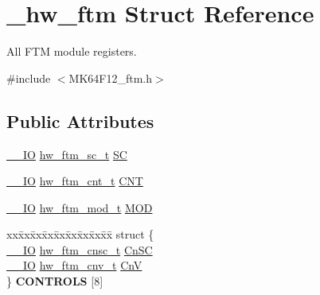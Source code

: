\hypertarget{struct__hw__ftm}{}\section{\+\_\+hw\+\_\+ftm Struct Reference}
\label{struct__hw__ftm}


All F\+TM module registers.  




{\ttfamily \#include $<$M\+K64\+F12\+\_\+ftm.\+h$>$}

\subsection*{Public Attributes}
\begin{DoxyCompactItemize}
\item 
\hyperlink{core__sc300_8h_aec43007d9998a0a0e01faede4133d6be}{\+\_\+\+\_\+\+IO} \hyperlink{union__hw__ftm__sc}{hw\+\_\+ftm\+\_\+sc\+\_\+t} \hyperlink{struct__hw__ftm_a7c673792073e9fee52359933a9a89143}{SC}
\item 
\hyperlink{core__sc300_8h_aec43007d9998a0a0e01faede4133d6be}{\+\_\+\+\_\+\+IO} \hyperlink{union__hw__ftm__cnt}{hw\+\_\+ftm\+\_\+cnt\+\_\+t} \hyperlink{struct__hw__ftm_a3869a58f40d4aece53973dab2e9932f7}{C\+NT}
\item 
\hyperlink{core__sc300_8h_aec43007d9998a0a0e01faede4133d6be}{\+\_\+\+\_\+\+IO} \hyperlink{union__hw__ftm__mod}{hw\+\_\+ftm\+\_\+mod\+\_\+t} \hyperlink{struct__hw__ftm_a07de5cd4783df103ad8f38d3d535665e}{M\+OD}
\item 
\begin{tabbing}
xx\=xx\=xx\=xx\=xx\=xx\=xx\=xx\=xx\=\kill
struct \{\\
\>\hyperlink{core__sc300_8h_aec43007d9998a0a0e01faede4133d6be}{\_\_IO} \hyperlink{union__hw__ftm__cnsc}{hw\_ftm\_cnsc\_t} \hyperlink{struct__hw__ftm_a13efffcf9fcf563fe12333cc09e14100}{CnSC}\\
\>\hyperlink{core__sc300_8h_aec43007d9998a0a0e01faede4133d6be}{\_\_IO} \hyperlink{union__hw__ftm__cnv}{hw\_ftm\_cnv\_t} \hyperlink{struct__hw__ftm_a20ce8f525843d17d1a7295e927e1f272}{CnV}\\
\} {\bfseries CONTROLS} \mbox{[}8\mbox{]}\hypertarget{struct__hw__ftm_a7d385f698017183d1b3d1045f643171d}{}\label{struct__hw__ftm_a7d385f698017183d1b3d1045f643171d}
\\


\end{tabbing}
\end{DoxyCompactItemize}
